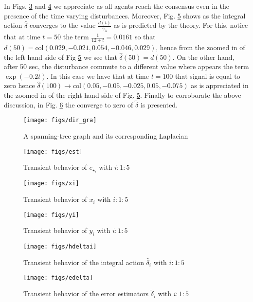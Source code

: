 \documentclass[journal,twoside]{IEEEtran}
\newcommand{\col}{ \mbox{col} }
\def\col{\mbox{col}}
\begin{document}
In  Figs. \ref{fig2} and \ref{fig3} we appreciate as all agents reach the consensus even in the presence of the time varying disturbances. Moreover,  Fig. \ref{fig4}  shows as the integral action $\hat \delta$  converges to the value $\frac{d(t)}{\gamma_3}$ as is predicted by the theory. For this,  notice that at time $t=50$ the term $\frac{1}{12+t}=0.0161$ so that $d(50)=\col(0.029, -0.021, 0.054, -0.046, 0.029) $, hence from the zoomed in of the left hand side of Fig \ref{fig4}  we see that $\hat \delta (50)= d(50)$.  On the other hand, after  50 sec, the disturbance commute to a different value where appears  the term $\exp(-0.2t)$. In this case we have that  at time $t=100$ that signal is equal to zero hence $\hat \delta (100) \to \col(0.05,-0.05, -0.025, 0.05, -0.075 ) $ as is appreciated in the zoomed in of the right hand side of Fig.  \ref{fig4}. Finally to corroborate the above discussion, in Fig. \ref{fig5} the converge to zero of $\tilde \delta$ is presented.  
  \begin{figure}[htp]
 \centering
\texttt{[image: figs/dir\_gra]}
\caption{A spanning-tree graph and its corresponding Laplacian}
\label{fig1}
\end{figure}
 
   \begin{figure}[htp]
 \centering
\texttt{[image: figs/est]}
\caption{Transient behavior of $e_{\star_i}$ with $i:1:5$}
\label{fig2}
\end{figure}

 
 
   \begin{figure}[htp]
 \centering
\texttt{[image: figs/xi]}
\caption{Transient behavior of $x_i$ with $i:1:5$}
\label{fig2}
\end{figure}

   \begin{figure}[htp]
 \centering
\texttt{[image: figs/yi]}
\caption{Transient behavior of $y_i$ with $i:1:5$}
\label{fig3}
\end{figure}
 
 
     \begin{figure}[htp]
 \centering
\texttt{[image: figs/hdeltai]}
\caption{Transient behavior of the integral action $\hat \delta_i$ with $i:1:5$}
\label{fig4}
\end{figure}

    \begin{figure}[htp]
 \centering
\texttt{[image: figs/edelta]}
\caption{Transient behavior of the error estimators $\tilde \delta_i$ with $i:1:5$}
\label{fig5}
\end{figure}
\end{document}

